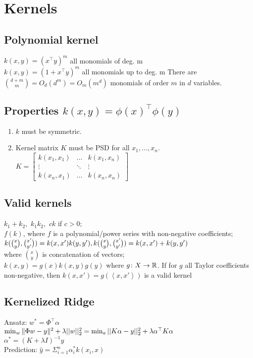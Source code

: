 \section*{Kernels}
\subsection*{Polynomial kernel}
$k(x,y) = (x^\top y)^m$  all monomials of deg. m \\
$k(x,y) = (1+x^\top y)^m$ all monomials up to deg. m
There are $\binom{d+m}{m}=O_d(d^m)=O_m(m^d)$ monomials of 
order $m$ in $d$ variables.

\subsection*{Properties $k(x,y) = \phi(x)^\top \phi(y)$}
\begin{enumerate}[noitemsep,leftmargin=*,topsep=0pt,parsep=0pt,partopsep=0pt]
    \item $k$ must be symmetric.
    \item Kernel matrix $K$ must be PSD for all $x_1,\dots,x_n$.\\
$K=\begin{bmatrix}
    k(x_1,x_1)&\dots&k(x_1,x_n) \\ 
    \vdots&\ddots&\vdots\\
    k(x_n,x_1)&\dots&k(x_n,x_n)
    \end{bmatrix}
$\end{enumerate}

\subsection*{Valid kernels}
$k_1 + k_2,$
$k_1 k_2,$
$  c k$ if $c>0;$\\
$f(k)$, where $f$ is a polynomial/power series with non-negative coefficients;\\
$k(\binom{x}{y}, \binom{x'}{y'})=k(x,x')k(y,y'),\\ 
k(\binom{x}{y}, \binom{x'}{y'})=k(x,x') + k(y,y')$ \\
where $\binom{x}{y}$ is concatenation of vectors;\\
$k(x,y)=g(x)k(x,y)g(y)$ where $g\colon X\to\mathbb{R}$.
If for $g$ all Taylor coefficients non-negative, then $k(x, x') = g(\left< x, x' \right>)$ is a valid kernel

\subsection*{Kernelized Ridge}
Ansatz: $w^*=\Phi^\top\alpha$\\
$\min_w\|\Phi w-y\|^2 + \lambda ||w||_2^2\\
=\min_a ||K\alpha -y||_2^2 + \lambda \alpha^\top K \alpha$\\
$\alpha^*=(K+\lambda I)^{-1} y$\\
Prediction: $\hat{y} = \Sigma_{i=1}^n \alpha_i^* k(x_i,x)$\\